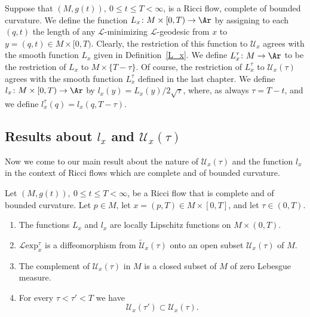 \begin{definition}
\label{def:reduced-length-global}
 Suppose that $(M,g(t)),\ 0\le t\le T<\infty$, is a Ricci
flow, complete of bounded curvature.  We define the function
$L_{x}\colon M\times [0,T)\to \Ar$ by assigning to each $(q,t)$ the
length of any ${\mathcal L}$-minimizing ${\mathcal L}$-geodesic from
$x$ to $y=(q,t)\in M\times [0,T)$. Clearly, the restriction of this
function to ${\mathcal U}_{x}$ agrees with the smooth function
$L_{x}$ given in Definition~\ref{L_x}. We define
 $L_{x}^\tau\colon M\to \Ar$ to be the restriction of $L_x$ to
 $M\times \{T-\tau\}$.
Of course, the restriction of $L_{x}^\tau$ to ${\mathcal
U}_{x}(\tau)$ agrees with the smooth function $L_{x}^\tau$ defined
in the last chapter. We define $l_{x}\colon M\times [0,T)\to \Ar$ by
$l_{x}(y)=L_{x}(y)/2\sqrt{\tau}$, where, as always $\tau=T-t$, and
we define $l_{x}^\tau(q)=l_{x}(q,T-\tau)$.
\end{definition}





\subsection{Results about $l_{x}$ and ${\mathcal
U}_{x}(\tau)$}

Now we come to our main result about the nature of ${\mathcal
U}_{x}(\tau)$ and the function $l_{x}$
in the context of Ricci flows which are complete and of bounded
curvature.



\begin{proposition}
\label{prop:l-exp-lipschitz-complete}
\label{lipcomplete}
Let $(M,g(t)),\ 0\le t\le T<\infty$, be a Ricci flow that is
complete and of bounded curvature. Let $p\in M$, let $x=(p,T)\in
M\times [0,T]$, and let $\tau\in (0,T)$.
\begin{enumerate}
\item[(1)] The functions $L_{x}$ and $l_{x}$ are locally Lipschitz functions
on $M\times (0,T)$.
\item[(2)] ${\mathcal L}\mathrm{exp}_{x}^\tau$
 is a diffeomorphism from $\widetilde{\mathcal U}_{x}(\tau)$ onto
an open subset ${\mathcal U}_{x}(\tau)$ of $M$.
\item[(3)] The complement of ${\mathcal U}_{x}(\tau)$ in $M$ is a closed
subset of $M$ of zero Lebesgue measure. \item[(4)]
 For every
$\tau<\tau'<T$ we have
$${\mathcal U}_{x}(\tau')\subset {\mathcal U}_{x}(\tau).$$
\end{enumerate}
\end{proposition}

